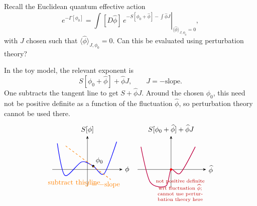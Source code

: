 Recall the Euclidean quantum effective action
\[
  e^{-\Gamma[\phi_0]}
  =
  \left.
  \int[D\widehat\phi]\,
  e^{-S[\phi_0+\widehat\phi]-\int\widehat\phi J}
  \right|_{\langle\widehat\phi\rangle_{J,\phi_0}=0},
\]
with \(J\) chosen such that \(\langle\widehat\phi\rangle_{J,\phi_0}=0\).
Can this be evaluated using perturbation theory?

In the toy model, the relevant exponent is
\[
  S[\phi_0+\widehat\phi]+\widehat\phi J,
  \qquad
  J=-\text{slope}.
\]
One subtracts the tangent line to get \(S+\widehat\phi J\).  Around the
chosen \(\phi_0\), this need not be positive definite as a function of
the fluctuation \(\widehat\phi\), so perturbation theory cannot be used
there.
\[
\begin{tikzpicture}[>=Stealth,scale=0.84]
  \begin{scope}
    \draw[->] (-2.1,0) -- (2.1,0) node[right] {\(\phi\)};
    \draw[->] (0,-1.0) -- (0,2.0) node[above] {\(S[\phi]\)};
    \draw[blue,line width=0.85pt]
      plot[smooth] coordinates {
        (-1.8,1.55) (-1.35,-0.35) (-0.35,0.45)
        (0.35,0.2) (1.0,-0.25) (1.75,1.65)
      };
    \fill (0.35,0.2) circle (2pt) node[above right] {\(\phi_0\)};
    \draw[orange,dashed,line width=0.75pt] (-1.3,1.4) -- (1.4,-0.6);
    \node[orange] at (0.9,-0.9) {\(J=-\text{slope}\)};
    \node[orange] at (-0.8,-0.75) {subtract this line};
  \end{scope}
  \begin{scope}[xshift=5.0cm]
    \draw[->] (-2.0,0) -- (2.1,0) node[right] {\(\widehat\phi\)};
    \draw[->] (0,-1.05) -- (0,2.0) node[above] {\(S[\phi_0+\widehat\phi]+\widehat\phi J\)};
    \draw[purple,line width=0.9pt]
      plot[smooth] coordinates {
        (-1.8,1.35) (-1.25,-0.75) (-0.3,-0.98)
        (0,0) (0.55,-0.22) (1.45,1.35)
      };
    \fill[red] (0,0) circle (2pt);
    \node[red!75!black,font=\scriptsize,align=center,text width=3.1cm]
      at (0.55,-1.25)
      {not positive definite wrt fluctuation \(\widehat\phi\);\\
       cannot use perturbation theory here};
  \end{scope}
\end{tikzpicture}
\]
